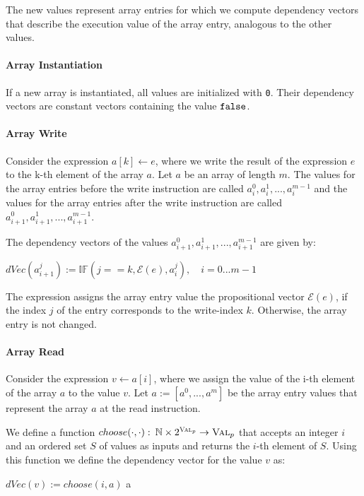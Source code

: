 The new values represent array entries for which we compute dependency vectors that describe the execution value of the array entry, analogous to the other values.

\paragraph{Array Instantiation}
If a new array is instantiated, all values are initialized with \texttt{0}. Their dependency vectors are constant vectors containing the value $\mathtt{false}$.

\paragraph{Array Write}
Consider the expression $a[k] \leftarrow e$, where we write the result of the expression $e$ to the k-th element of the array $a$. Let $a$ be an array of length $m$. The values for the array entries before the write instruction are called $a_i^0, a_i^1,..., a_i^{m-1}$ and the values for the array entries after the write instruction are called $a_{i+1}^0, a_{i+1}^1,..., a_{i+1}^{m-1}$.

The dependency vectors of the values $a_{i+1}^0, a_{i+1}^1,..., a_{i+1}^{m-1}$ are given by:
\begin{center}
    $dVec(a_{i+1}^j) := \mathbb{IF}(j == k, \mathcal{E}(e), a_i^j), \quad i = 0...m-1$
\end{center}
The expression assigns the array entry value the propositional vector $\mathcal{E}(e)$, if the index $j$ of the entry corresponds to the write-index $k$. Otherwise, the array entry is not changed.

\paragraph{Array Read}
Consider the expression $v \leftarrow a[i]$, where we assign the value of the i-th element of the array $a$ to the value $v$.
Let $a := [a^0, ..., a^m]$ be the array entry values that represent the array $a$ at the read instruction.

We define a function $choose(\cdot, \cdot): \: \mathbb{N} \times 2^{\textsc{Val}_p} \to \textsc{Val}_p$ that accepts an integer $i$ and an ordered set $S$ of values as inputs and returns the $i$-th element of $S$. Using this function we define the dependency vector for the value $v$ as:
\begin{center}
    $dVec(v) := choose(i, a)$
 a\end{center}